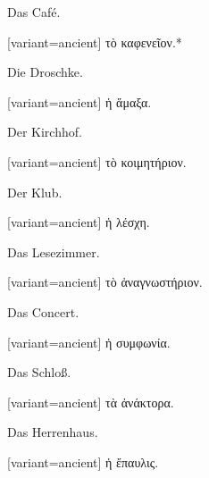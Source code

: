 Das Café.

\switchcolumn

\begin{greek}[variant=ancient]%
τὸ καφενεῖον.{*}

\end{greek}%
\switchcolumn*

Die Droschke.

\switchcolumn

\begin{greek}[variant=ancient]%
ἡ ἅμαξα.

\end{greek}%
\switchcolumn*

Der Kirchhof.

\switchcolumn

\begin{greek}[variant=ancient]%
τὸ κοιμητήριον.

\end{greek}%
\switchcolumn*

Der Klub.

\switchcolumn

\begin{greek}[variant=ancient]%
ἡ λέσχη.

\end{greek}%
\switchcolumn*

Das Lesezimmer.

\switchcolumn

\begin{greek}[variant=ancient]%
τὸ ἀναγνωστήριον.

\end{greek}%
\switchcolumn*

Das Concert.

\switchcolumn

\begin{greek}[variant=ancient]%
ἡ συμφωνία.

\end{greek}%
\switchcolumn*

Das Schloß.

\switchcolumn

\begin{greek}[variant=ancient]%
τὰ ἀνάκτορα.

\end{greek}%
\switchcolumn*

Das Herrenhaus.

\switchcolumn

\begin{greek}[variant=ancient]%
ἡ ἔπαυλις.

\end{greek}%
\switchcolumn*

